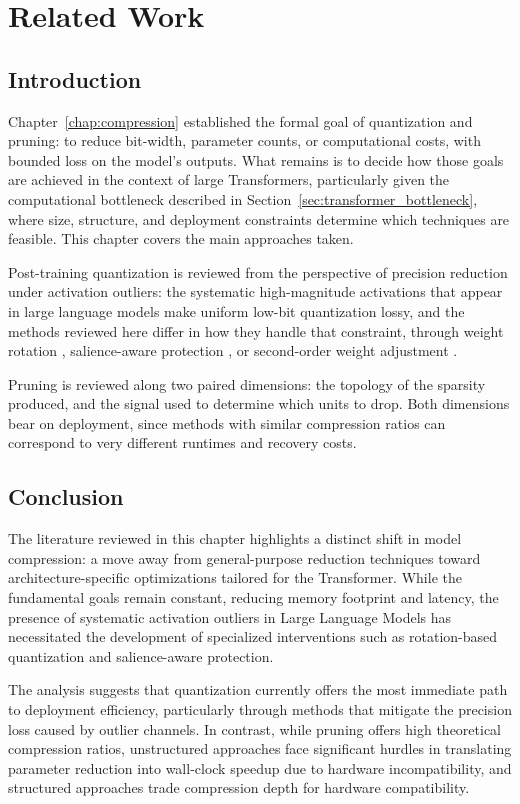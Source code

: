 \chapter{Related Work}
\label{chap:related_work}

\section{Introduction}

Chapter~\ref{chap:compression} established the formal goal of quantization and pruning: to reduce bit-width, parameter counts, or computational costs, with bounded loss on the model's outputs. What remains is to decide how those goals are achieved in the context of large Transformers, particularly given the computational bottleneck described in Section~\ref{sec:transformer_bottleneck}, where size, structure, and deployment constraints determine which techniques are feasible. This chapter covers the main approaches taken.

Post-training quantization is reviewed from the perspective of precision reduction under activation outliers: the systematic high-magnitude activations that appear in large language models make uniform low-bit quantization lossy, and the methods reviewed here differ in how they handle that constraint, through weight rotation \cite{ashkboos2024quarot}, salience-aware protection \cite{lin2024awq}, or second-order weight adjustment \cite{frantar2022gptq}.

Pruning is reviewed along two paired dimensions: the topology of the sparsity produced, and the signal used to determine which units to drop. Both dimensions bear on deployment, since methods with similar compression ratios can correspond to very different runtimes and recovery costs.


\newpage




\section{Conclusion}
The literature reviewed in this chapter highlights a distinct shift in model compression: a move away from general-purpose reduction techniques toward architecture-specific optimizations tailored for the Transformer. While the fundamental goals remain constant, reducing memory footprint and latency, the presence of systematic activation outliers in Large Language Models has necessitated the development of specialized interventions such as rotation-based quantization and salience-aware protection.

The analysis suggests that quantization currently offers the most immediate path to deployment efficiency, particularly through methods that mitigate the precision loss caused by outlier channels. In contrast, while pruning offers high theoretical compression ratios, unstructured approaches face significant hurdles in translating parameter reduction into wall-clock speedup due to hardware incompatibility, and structured approaches trade compression depth for hardware compatibility.

